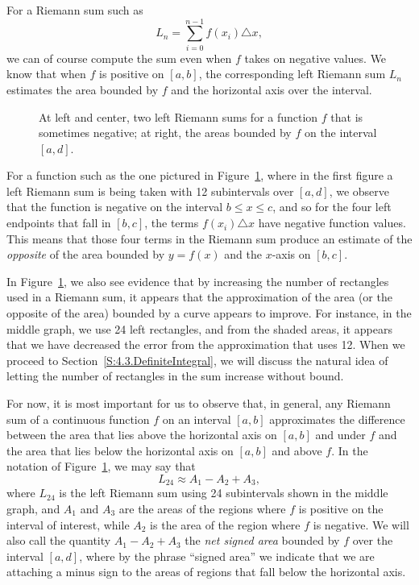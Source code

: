 For a Riemann sum such as 
$$L_n = \sum_{i=0}^{n-1} f(x_i) \triangle x,$$
we can of course compute the sum even when $f$ takes on negative values.  We know that when $f$ is positive on $[a,b]$, the corresponding left Riemann sum $L_n$ estimates the area bounded by $f$ and the horizontal axis over the interval.  
\begin{figure}[h]
\begin{center}
\caption{At left and center, two left Riemann sums for a function $f$ that is sometimes negative; at right, the areas bounded by $f$ on the interval $[a,d]$.} \label{F:4.2.NegF}
\end{center}
\end{figure}
For a function such as the one pictured in Figure~\ref{F:4.2.NegF}, where in the first figure a left Riemann sum is being taken with 12 subintervals over $[a,d]$, we observe that the function is negative on the interval $b \le x \le c$, and so for the four left endpoints that fall in $[b,c]$, the terms $f(x_i) \triangle x$ have negative function values.  This means that those four terms in the Riemann sum produce an estimate of the \emph{opposite} of the area bounded by $y = f(x)$ and the $x$-axis on $[b,c]$.

In Figure~\ref{F:4.2.NegF}, we also see evidence that by increasing the number of rectangles used in a Riemann sum, it appears that the approximation of the area (or the opposite of the area) bounded by a curve appears to improve.  For instance, in the middle graph, we use 24 left rectangles, and from the shaded areas, it appears that we have decreased the error from the approximation that uses 12.  When we proceed to Section~\ref{S:4.3.DefiniteIntegral}, we will discuss the natural idea of letting the number of rectangles in the sum increase without bound.  

For now, it is most important for us to observe that, in general, any Riemann sum of a continuous function $f$ on an interval $[a,b]$ approximates the difference between the area that lies above the horizontal axis on $[a,b]$ and under $f$ and the area that lies below the horizontal axis on $[a,b]$ and above $f$.  In the notation of Figure~\ref{F:4.2.NegF}, we may say that
$$L_{24} \approx A_1 - A_2 + A_3,$$
where $L_{24}$ is the left Riemann sum using 24 subintervals shown in the middle graph, and $A_1$ and $A_3$ are the areas of the regions where $f$ is positive on the interval of interest, while $A_2$ is the area of the region where $f$ is negative.  We will also call the quantity $A_1 - A_2 + A_3$ the \emph{net signed area}  bounded by $f$ over the interval $[a,d]$, where by the phrase ``signed area'' we indicate that we are attaching a minus sign to the areas of regions that fall below the horizontal axis.

